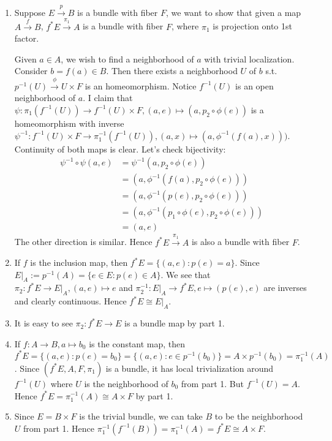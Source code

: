 \documentclass[12pt]{article}
\begin{document}
\begin{problem}[6]
\begin{enumerate}[label=(\arabic*)]
	\item Suppose $ E \xrightarrow{ p} B $ is a bundle with fiber $ F$, we want to show that given a map $ A \xrightarrow{ f} B $, $ f^* E \xrightarrow{ \pi_1} A$ is a bundle with fiber $ F$, where $ \pi_1$ is projection onto 1st factor.

		Given $ a \in A$, we wish to find a neighborhood of $ a$ with trivial localization. Consider  $ b = f(a) \in B$. Then there exists a neighborhood $ U$ of  $ b$  s.t.\ $ p ^{-1}(U) \xrightarrow{ \phi} U \times F$ is an homeomorphism. Notice $ f^{-1}(U)$ is an open neighborhood of $ a$. I claim that  $ \psi: \pi_1(f^{-1}(U)) \to f^{-1}(U) \times F, (a,e) \mapsto (a, p_2 \circ \phi(e))$ is a homeomorphism with inverse $ \psi ^{-1}: f^{-1}(U) \times F \to \pi_1 ^{-1}(f^{-1}(U)), (a,x) \mapsto (a, \phi ^{-1}(f(a),x)))$. Continuity of both maps is clear. Let's check bijectivity:
\begin{align*}
	\psi ^{-1} \circ \psi(a,e) &= \psi ^{-1}(a,p_2 \circ \phi(e)) \\
	&= (a, \phi ^{-1}(f(a),p_2 \circ \phi(e))) \\
	&= (a, \phi ^{-1}(p(e), p_2 \circ \phi(e))) \\
	&= (a, \phi ^{-1}(p_1 \circ \phi(e), p_2 \circ \phi(e))) \\
	&= (a,e) 
\end{align*}
The other direction is similar. Hence $ f^* E \xrightarrow{ \pi_1}A $ is also a bundle with fiber $ F$.
\item If  $ f$ is the inclusion map, then  $ f^* E = \{(a,e): p(e) = a\}$. Since $ E|_A:= p ^{-1}(A) = \{e \in E: p(e) \in A\}$. We see that $ \pi_2: f^* E \to E|_A, (a,e) \mapsto e$ and $\pi_2 ^{-1}:E|_A \to f^* E, e \mapsto (p(e),e)$ are inverses and clearly continuous. Hence $ f^* E \cong E|_A$.
\item It is easy to see $ \pi_2: f^* E \to E$ is a bundle map by part 1.
\item If $ f: A \to B, a \mapsto b_0$ is the constant map, then $ f^* E = \{(a,e): p(e) = b_0\}= \{(a,e): e \in p ^{-1}(b_0)\} = A \times p ^{-1}(b_0) = \pi_1^{-1}(A)$. Since $ (f^* E,A,F, \pi_1)$ is a bundle, it has local trivialization around $ f^{-1}(U)$ where $ U$ is the neighborhood of  $ b_0$ from part 1. But $ f^{-1}(U) = A$. Hence $f^* E = \pi_1^{-1}(A) \cong A \times F$ by part 1.
\item Since $ E =B \times F$ is the trivial bundle, we can take $ B$ to be the neighborhood  $ U$ from part 1. Hence  $\pi_1^{-1}(f^{-1}(B)) = \pi_1^{-1}(A) =f^* E \cong A \times F$.
\end{enumerate}
\end{problem}
\end{document}
